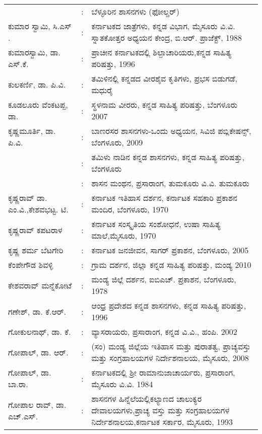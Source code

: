 \begin{longtable}[l]{@{}>{\raggedright}p{4.7cm}cp{9.2cm}<{\raggedright}@{}}
& : & ಬೆಳ್ಳೂರಿನ ಶಾಸನಗಳು (ಫೋಲ್ಡರ್​)\\
ಕುಮಾರ ಸ್ವಾಮಿ, ಸಿ.ಎಸ್​. & : & ಕರ್ನಾಟಕದ ಜಾತ್ರೆಗಳು, ಕನ್ನಡ ವಿಭಾಗ, ಮೈಸೂರು ವಿ.ವಿ. ಸ್ನಾತಕೋತ್ತರ ಅಧ್ಯಯನ ಕೇಂದ್ರ, ಬಿ.ಆರ್​. ಪ್ರಾಜೆಕ್ಟ್​, 1988\\
ಕುಮಾರಸ್ವಾಮಿ, ಡಾ. ಎಸ್​.ಕೆ. & : & ಪ್ರಾಚೀನ ಕರ್ನಾಟಕದಲ್ಲಿ ಶಿಲ್ಪಾಚಾರಿಯರು,\newline ಕನ್ನಡ ಸಾಹಿತ್ಯ ಪರಿಷತ್ತು, 1996\\
ಕುಲಕರ್ಣಿ, ಡಾ. ಪಿ.ವಿ. & : & ತಮಿಳಿನಲ್ಲಿ ಕನ್ನಡದ ವೀರಶೈವ ಕೃತಿಗಳು, ಪ್ರಭಸ ಬಿಡುಗಡೆ, ಮಧುರೈ\\
ಕೂಡಲೂರು ವೆಂಕಟಪ್ಪ, ಡಾ. & : &  ಸ್ಥಳನಾಮ ವೀರರು, ಕನ್ನಡ ಸಾಹಿತ್ಯ ಪರಿಷತ್ತು, ಬೆಂಗಳೂರು 2007\\
ಕೃಷ್ಣಮೂರ್ತಿ, ಡಾ. ಪಿ.ವಿ. & : &  ಬಾಣರಸರ ಶಾಸನಗಳು-ಒಂದು ಅಧ್ಯಯನ, ಸಿವಿಜಿ ಪಬ್ಲಿಕೇಷನ್ಸ್​, ಬೆಂಗಳೂರು, 2009\\
                              & :  & ತಮಿಳು ನಾಡಿನ ಕನ್ನಡ ಶಾಸನಗಳು, ಕನ್ನಡ ಸಾಹಿತ್ಯ ಪರಿಷತ್ತು, ಬೆಂಗಳೂರು\\
               & : & ಶಾಸನ ಮಂಥನ, ಪ್ರಸಾರಾಂಗ, ತುಮಕೂರು ವಿ.ವಿ. ತುಮಕೂರು\\
 ಕೃಷ್ಣರಾವ್​ ಡಾ. ಎಂ.ವಿ.,\newline ಕೇಶವಭಟ್ಟ. ಟಿ. & : & ಕರ್ನಾಟಕ ಇತಿಹಾಸ ದರ್ಶನ, ಕರ್ನಾಟಕ ಸಹಕಾರಿ ಪ್ರಕಾಶನ ಮಂದಿರ, ಬೆಂಗಳೂರು, 1970\\
ಕೃಷ್ಣರಾವ್​ ಕಪಟರಾಳ & : & ಕರ್ನಾಟಕ ಸಂಸ್ಕೃತಿಯ ಸಂಶೋಧನೆ, ಉಷಾ ಸಾಹಿತ್ಯ ಮಾಲೆ,\newline ಮೈಸೂರು, 1970\\
ಕೃಷ್ಣ ಶರ್ಮ ಬೆಟಗೇರಿ & : & ಕರ್ನಾಟಕ ಜನಜೀವನ, ಸಾಗರ್​ ಪ್ರಕಾಶನ, ಬೆಂಗಳೂರು, 2005\\
ಕೆಂಪೇಗೌಡ ಶಿವಳ್ಳಿ & : & ಗ್ರಾಮ ದರ್ಶನ, ಜಿಲ್ಲಾ ಕನ್ನಡ ಸಾಹಿತ್ಯ ಪರಿಷತ್ತು, ಮಂಡ್ಯ 2010\\
ಕೇಶವರಾವ್​ ಮನ್ನೆಕೋಟೆ & : & ಮಂಡ್ಯ ಜಿಲ್ಲೆ ದರ್ಶನ, ಐಬಿಎಚ್​. ಪ್ರಕಾಶನ, ಬೆಂಗಳೂರು, 1978\\
ಗಣೇಶ್​, ಡಾ. ಕೆ.ಆರ್​. & : & ಆಂಧ್ರ ಪ್ರದೇಶದ ಕನ್ನಡ ಶಾಸನಗಳು, ಕನ್ನಡ ಸಾಹಿತ್ಯ ಪರಿಷತ್ತು, 1996\\
ಗೋಕುಲನಾಥ್​, ಡಾ. ಕೆ. & : &  ವ್ಯಾಸರಾಯರು, ಪ್ರಸಾರಾಂಗ, ಕನ್ನಡ ವಿ.ವಿ., ಹಂಪಿ. 2002\\
ಗೋಪಾಲ್​, ಡಾ. ಆರ್​. & : &  (ಸಂ) ಮಂಡ್ಯ ಜಿಲ್ಲೆಯ ಇತಿಹಾಸ ಮತ್ತು ಪುರಾತತ್ವ, ಪ್ರಾಚ್ಯವಸ್ತು ಮತ್ತು ಸಂಗ್ರಹಾಲಯಗಳ ನಿರ್ದೇಶನಾಲಯ, ಮೈಸೂರು, 2008\\
ಗೋಪಾಲ್​, ಡಾ. ಬಾ.ರಾ. & : & ಕರ್ನಾಟಕದಲ್ಲಿ ಶ‍್ರೀ ರಾಮಾನುಜಾಚಾರ್ಯರು, ಪ್ರಸಾರಾಂಗ, ಮೈಸೂರು ವಿ.ವಿ. 1984\\
ಗೋಪಾಲ ರಾವ್​, ಡಾ. ಎಚ್​.ಎಸ್​. & : & ಶಾಸನಗಳ ಹಿನ್ನೆಲೆಯಲ್ಲಿಕಲ್ಯಾಣದ ಚಾಲುಕ್ಯರ ದೇವಾಲಯಗಳು,\newline ಪ್ರಾಚ್ಯ ವಸ್ತು ಮತ್ತು ಸಂಗ್ರಹಾಲಯಗಳ ನಿರ್ದೇಶನಾಲಯ,\newline ಕರ್ನಾಟಕ ಸರ್ಕಾರ, ಮೈಸೂರು, 1993\\

\end{longtable}
